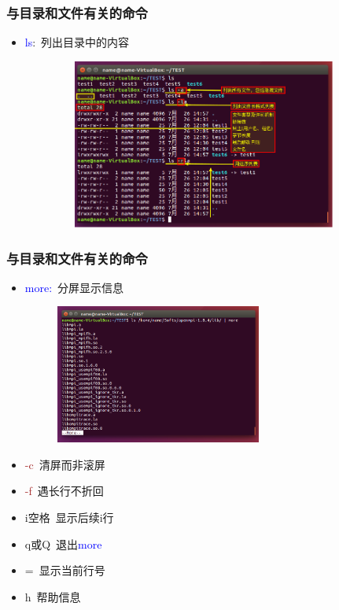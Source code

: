 \frame
{
	\frametitle{与目录和文件有关的命令}
	\begin{itemize}
		\item \textcolor{blue}{ls}:~列出目录中的内容
\begin{figure}[h!]
\centering
\vspace{-2.5pt}
\includegraphics[height=2.2in,width=3.9in,viewport=0 0 800 470,clip]{Figures/Ubuntu-ls.png}
\label{Linux-command-ls}
\end{figure}
	\end{itemize}
}

\frame
{
	\frametitle{与目录和文件有关的命令}
\begin{minipage}{0.58\textwidth}
\begin{itemize}
	\item \textcolor{blue}{more:}~分屏显示信息
\begin{figure}[h!]
\centering
\hspace*{-32.5pt}
\vspace{-18.5pt}
\includegraphics[height=1.8in,width=2.7in,viewport=0 0 800 500,clip]{Figures/Ubuntu-more.png}
\label{Linux-command-more}
\end{figure}
	\end{itemize}
\end{minipage}
\begin{minipage}{0.38\textwidth}
	\begin{itemize}
		\item \textcolor{brown}{-c}~清屏而非滚屏
		\item \textcolor{brown}{-f}~遇长行不折回
		\item \textrm{i}空格~显示后续\textrm{i}行
		\item \textrm{q}或\textrm{Q}~退出\textcolor{blue}{more}
		\item \textrm{=}~显示当前行号
		\item \textrm{h}~帮助信息
	\end{itemize}
\end{minipage}
}

